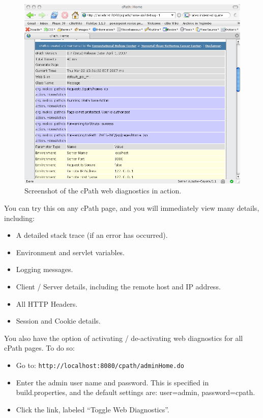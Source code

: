 \documentclass[letterpaper,12pt]{article}
\begin{document}
\begin{figure}
  \includegraphics[scale=0.3]{figures/web_diagnostics.png}
  \caption{Screenshot of the cPath web diagnostics in action.}
\label{web_diagnostics}
\end{figure}

You can try this on any cPath page, and you will immediately view many details, including:

\begin{itemize}

\item A detailed stack trace (if an error has occurred).

\item Environment and servlet variables.

\item Logging messages.

\item Client / Server details, including the remote host and IP address.

\item All HTTP Headers.

\item Session and Cookie details.

\end{itemize}

You also have the option of activating / de-activating web diagnostics for all cPath pages.  To do so:

\begin{itemize}

\item Go to:  \verb+http://localhost:8080/cpath/adminHome.do+

\item Enter the admin user name and password.  This is specified in build.properties, and the default settings are:  user=admin, password=cpath.

\item Click the link, labeled ``Toggle Web Diagnostics''.

\end{itemize}
\end{document}
